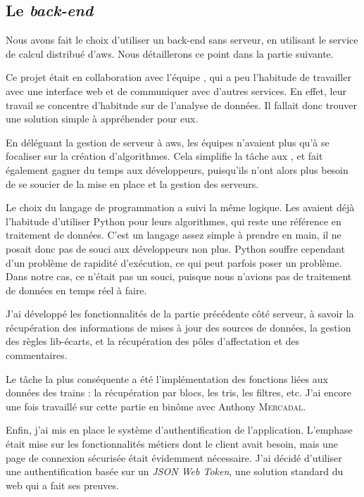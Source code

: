 \newpage
\subsection{Le \textit{back-end}}

Nous avons fait le choix d'utiliser un \gls{back-end} sans serveur, en utilisant le service de calcul distribué d'\gls{aws}. Nous détaillerons ce point dans la partie suivante.

Ce projet était en collaboration avec l'équipe \ds, qui a peu l'habitude de travailler avec une interface web et de communiquer avec d'autres services. En effet, leur travail se concentre d'habitude sur de l'analyse de données.
Il fallait donc trouver une solution simple à appréhender pour eux.

En déléguant la gestion de serveur à \gls{aws}, les équipes n'avaient plus qu'à se focaliser sur la création d'algorithmes. Cela simplifie la tâche aux \ds, et fait également gagner du temps aux développeurs, puisqu'ils n'ont alors plus besoin de se soucier de la mise en place et la gestion des serveurs.

Le choix du langage de programmation a suivi la même logique. Les \ds avaient déjà l'habitude d'utiliser Python pour leurs algorithmes, qui reste une référence en traitement de données. C'est un langage assez simple à prendre en main, il ne posait donc pas de souci aux développeurs non plus.
Python souffre cependant d'un problème de rapidité d'exécution, ce qui peut parfois poser un problème. Dans notre cas, ce n'était pas un souci, puisque nous n'avions pas de traitement de données en temps réel à faire.

J'ai développé les fonctionnalités de la partie précédente côté serveur, à savoir la récupération des informations de mises à jour des sources de données, la gestion des règles lib-écarts, et la récupération des pôles d'affectation et des commentaires.

Le tâche la plus conséquente a été l'implémentation des fonctions liées aux données des trains : la récupération par blocs, les tris, les filtres, etc.
J'ai encore une fois travaillé sur cette partie en binôme avec Anthony \textsc{Mercadal}.

Enfin, j'ai mis en place le système d'authentification de l'application. L'emphase était mise sur les fonctionnalités métiers dont le client avait besoin, mais une page de connexion sécurisée était évidemment nécessaire.
J'ai décidé d'utiliser une authentification basée sur un \textit{JSON Web Token}, une solution standard du web qui a fait ses preuves.

